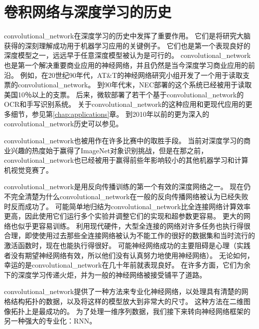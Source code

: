 \section{卷积网络与深度学习的历史}
\label{sec:convolutional_networks_and_the_history_of_deep_learning}
 
 
\gls{convolutional_network}在深度学习的历史中发挥了重要作用。
它们是将研究大脑获得的深刻理解成功用于机器学习应用的关键例子。
它们也是第一个表现良好的深度模型之一，远远早于任意深度模型被认为是可行的。
\gls{convolutional_network}也是第一个解决重要商业应用的神经网络，并且仍然是当今深度学习商业应用的前沿。
例如，在20世纪90年代，AT\&T的神经网络研究小组开发了一个用于读取支票的\gls{convolutional_network}\citep{chapter-gradient-document-2001}。
到90年代末，NEC部署的这个系统已经被用于读取美国10％以上的支票。
后来，微软部署了若干个基于\gls{convolutional_network}的OCR和手写识别系统\citep{simard-03-small}。 
关于\gls{convolutional_network}的这种应用和更现代应用的更多细节，参见第\ref{chap:applications}章。
到2010年以前的更为深入的\gls{convolutional_network}历史可以参见\citep{Lecun_convolutionalnetworks}。

\gls{convolutional_network}也被用作在许多比赛中的取胜手段。
当前对深度学习的商业兴趣的热度始于\cite{Krizhevsky-2012-small}赢得了ImageNet对象识别挑战，但是在那之前，\gls{convolutional_network}也已经被用于赢得前些年影响较小的其他机器学习和计算机视觉竞赛了。
 
 
\gls{convolutional_network}是用反向传播训练的第一个有效的深度网络之一。
现在仍不完全清楚为什么\gls{convolutional_network}在一般的反向传播网络被认为已经失败时反而成功了。
可能简单地归结为\gls{convolutional_network}比全连接网络计算效率更高，因此使用它们运行多个实验并调整它们的实现和超参数更容易。
更大的网络也似乎更容易训练。
利用现代硬件，大型全连接的网络对许多任务也执行得很合理，即使使用过去那些全连接网络被认为不能工作的很好的数据集和当时流行的激活函数时，现在也能执行得很好。
可能神经网络成功的主要阻碍是心理（实践者没有期望神经网络有效，所以他们没有认真努力地使用神经网络）。
无论如何，幸运的是\gls{convolutional_network}在几十年前就表现良好。
在许多方面，它们为余下的深度学习传递火炬，并为一般的神经网络被接受铺平了道路。

\gls{convolutional_network}提供了一种方法来专业化神经网络，以处理具有清楚的网格结构拓扑的数据，以及将这样的模型放大到非常大的尺寸。 
这种方法在二维图像拓扑上是最成功的。
为了处理一维序列数据，我们接下来转向神经网络框架的另一种强大的专业化：\gls{RNN}。

 
 










